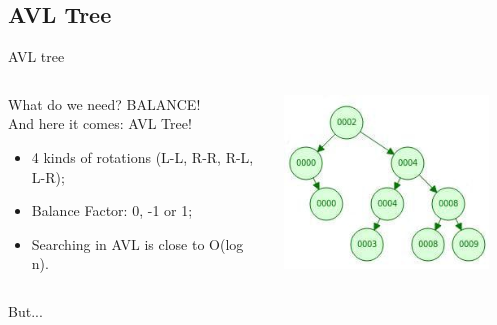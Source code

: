 \documentclass{beamer}
\begin{document}
\subsection{AVL Tree}

\begin{frame}{AVL tree}

\begin{columns}
\begin{column}{0.5\textwidth}
   \begin{block}{What do we need? BALANCE!\\And here it comes: AVL Tree!}\end{block}
 \begin{itemize}
    \item 4 kinds of rotations (L-L, R-R, R-L, L-R);
    \item Balance Factor: 0, -1 or 1;
    \item Searching in AVL is close to O(log n).
\end{itemize}
\end{column}
\begin{column}{0.5\textwidth}
    \begin{center}
     \includegraphics[width=0.9\textwidth]{avl.jpeg}
     \end{center}
\end{column}
\end{columns}
\end{frame}

\begin{frame}{But...}
\centering\color{red}{\Huge AVL needs too many rotations!!!}
\end{frame}
\end{document}
